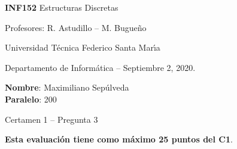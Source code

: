 \documentclass[legalpaper,10pt]{article}
\begin{document}
\thispagestyle{empty}

\begin{minipage}[t]{0.6\textwidth}

{\LARGE \textbf{INF152} Estructuras Discretas}

{\large Profesores: R. Astudillo -- M. Bugueño}

Universidad Técnica Federico Santa Mar\'{\i}a

Departamento de Informática -- Septiembre 2, 2020.

\end{minipage}
\hfill
\begin{minipage}[t]{0.35\textwidth}
\textbf{Nombre}: Maximiliano Sepúlveda \\[0.3cm]
  \textbf{Paralelo}: 200
\end{minipage}

\vspace{0.8cm}

{\Large Certamen 1 -- Pregunta 3}

\vspace{0.4cm}

\textbf{Esta evaluación tiene como máximo 25 puntos del C1}.
\end{document}
